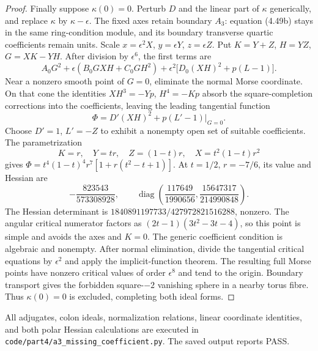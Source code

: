 \begin{proof}
Finally suppose $\kappa(0)=0$. Perturb $D$ and the
linear part of $\kappa$ generically, and replace
$\kappa$ by $\kappa-\epsilon$. The fixed axes retain
boundary $A_3$: equation (4.49b) stays in the same
ring-condition module, and its boundary transverse
quartic coefficients remain units.
Scale $x=\epsilon^2X$, $y=\epsilon Y$, $z=\epsilon Z$.
Put $K=Y+Z$, $H=YZ$, $G=XK-YH$.
After division by $\epsilon^6$, the first terms are
\[
 A_0G^2+\epsilon(B_0GXH+C_0GH^2)
   +\epsilon^2\bigl[D_0(XH)^2+p(L-1)\bigr].
\]
Near a nonzero smooth point of $G=0$, eliminate the
normal Morse coordinate. On that cone the identities
$XH^3=-Yp$, $H^4=-Kp$ absorb the square-completion
corrections into the coefficients, leaving the leading
tangential function
\[
                    \Phi=D'(XH)^2+p(L'-1)|_{G=0}.
\]
Choose $D'=1$, $L'=-Z$ to exhibit a nonempty open
set of suitable coefficients. The parametrization
\[
 K=r,\quad Y=tr,\quad Z=(1-t)r,\quad
 X=t^2(1-t)r^2
\]
gives $\Phi=t^4(1-t)^4r^7[1+r(t^2-t+1)]$.
At $t=1/2$, $r=-7/6$, its value and Hessian are
\[
 -\frac{823543}{573308928},\qquad
 \operatorname{diag}\left(\frac{117649}{1990656},
                          \frac{15647317}{214990848}\right).
\]
The Hessian determinant is
$1840891197733/427972821516288$, nonzero.
The angular critical numerator factors as
$(2t-1)(3t^2-3t-4)$, so this point is simple and
avoids the axes and $K=0$. The generic coefficient
condition is algebraic and nonempty. After normal
elimination, divide the tangential critical equations
by $\epsilon^2$ and apply the implicit-function theorem.
The resulting full Morse points have nonzero critical
values of order $\epsilon^8$ and tend to the origin.
Boundary transport gives the forbidden square-$-2$
vanishing sphere in a nearby torus fibre. Thus
$\kappa(0)=0$ is excluded, completing both ideal forms.
\end{proof}

All adjugates, colon ideals, normalization relations,
linear coordinate identities, and both polar Hessian
calculations are executed in
\texttt{code/part4/a3\_missing\_coefficient.py}.
The saved output reports PASS.

